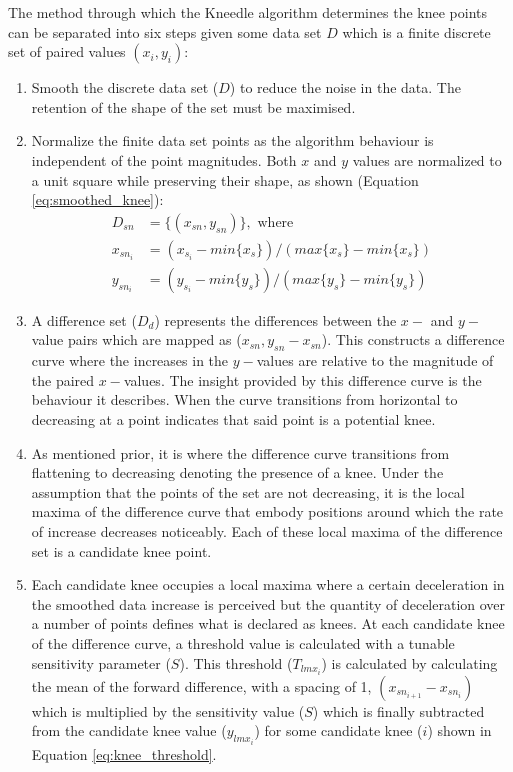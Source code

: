 The method through which the Kneedle algorithm determines the knee points can be separated into six steps given some data set $D$ which is a finite discrete set of paired values $(x_i,y_i)$: 
\begin{enumerate}
    \item Smooth the discrete data set ($D$) to reduce the noise in the data. The retention of the shape of the set must be maximised.
    \item Normalize the finite data set points as the algorithm behaviour is independent of the point magnitudes. Both $x$ and $y$ values are normalized to a unit square while preserving their shape, as shown (Equation \ref{eq:smoothed_knee}):
    \begin{equation}\label{eq:smoothed_knee}
        \begin{split}
            D_{sn} &= \{(x_{sn},y_{sn})\},\text{ where}\\
            x_{sn_i} &= (x_{s_i}-min\{x_s\})/(max\{x_s\}-min\{x_s\})\\
            y_{sn_i} &= (y_{s_i}-min\{y_s\})/(max\{y_s\}-min\{y_s\})
        \end{split}
    \end{equation}
    \item A difference set ($D_d$) represents the differences between the $x-$ and $y-$value pairs which are mapped as ($x_{sn}, y_{sn}-x_{sn}$). This constructs a difference curve where the increases in the $y-$values are relative to the magnitude of the paired $x-$values. The insight provided by this difference curve is the behaviour it describes. When the curve transitions from horizontal to decreasing at a point indicates that said point is a potential knee.
    \item As mentioned prior, it is where the difference curve transitions from flattening to decreasing denoting the presence of a knee. Under the assumption that the points of the set are not decreasing, it is the local maxima of the difference curve that embody positions around which the rate of increase decreases noticeably. Each of these local maxima of the difference set is a candidate knee point.
    \item Each candidate knee occupies a local maxima where a certain deceleration in the smoothed data increase is perceived but the quantity of deceleration over a number of points defines what is declared as knees. At each candidate knee of the difference curve, a threshold value is calculated with a tunable sensitivity parameter ($S$). This threshold ($T_{lmx_i}$) is calculated by calculating the mean of the forward difference, with a spacing of 1, $(x_{sn_{i+1}}-x_{sn_i})$ which is multiplied by the sensitivity value ($S$) which is finally subtracted from the candidate knee value ($y_{lmx_i}$) for some candidate knee ($i$) shown in Equation \ref{eq:knee_threshold}.

\end{enumerate}
